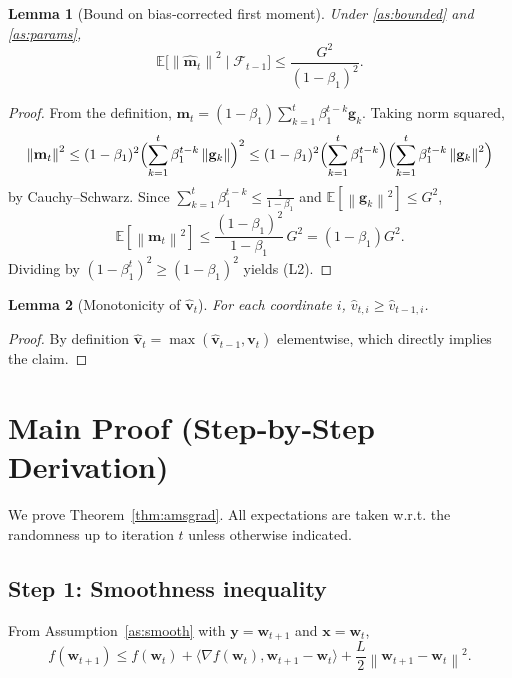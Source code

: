 \documentclass[11pt]{article}
\newtheorem{lemma}{Lemma}
\newcommand{\EE}{\mathbb{E}}
\newcommand{\norm}[1]{\left\lVert #1\right\rVert}
\begin{document}
\begin{lemma}[Bound on bias‑corrected first moment]\label{lem:mbound}
Under \ref{as:bounded} and \ref{as:params},
\[
\EE\bigl[\norm{\hat{\mathbf{m}}_{t}}^{2}\mid\mathcal{F}_{t-1}\bigr]
\le\frac{G^{2}}{(1-\beta_{1})^{2}}.
\tag{L2}
\]
\end{lemma}
\begin{proof}
From the definition,
$\mathbf{m}_{t}=(1-\beta_{1})\sum_{k=1}^{t}\beta_{1}^{t-k}\mathbf{g}_{k}$.
Taking norm squared,
\[
\norm{\mathbf{m}_{t}}^{2}
\le(1-\beta_{1})^{2}\Bigl(\sum_{k=1}^{t}\beta_{1}^{t-k}\norm{\mathbf{g}_{k}}\Bigr)^{2}
\le(1-\beta_{1})^{2}\Bigl(\sum_{k=1}^{t}\beta_{1}^{t-k}\Bigr)
\Bigl(\sum_{k=1}^{t}\beta_{1}^{t-k}\norm{\mathbf{g}_{k}}^{2}\Bigr)
\]
by Cauchy–Schwarz. Since $\sum_{k=1}^{t}\beta_{1}^{t-k}\le\frac{1}{1-\beta_{1}}$
and $\EE[\norm{\mathbf{g}_{k}}^{2}]\le G^{2}$,
\[
\EE[\norm{\mathbf{m}_{t}}^{2}]
\le\frac{(1-\beta_{1})^{2}}{1-\beta_{1}}\,G^{2}
= (1-\beta_{1})G^{2}.
\]
Dividing by $(1-\beta_{1}^{t})^{2}\ge(1-\beta_{1})^{2}$ yields (L2).
\end{proof}

\begin{lemma}[Monotonicity of $\hat{\mathbf{v}}_{t}$]\label{lem:monotone}
For each coordinate $i$, $\hat{v}_{t,i}\ge\hat{v}_{t-1,i}$.
\end{lemma}
\begin{proof}
By definition $\hat{\mathbf{v}}_{t}=\max(\hat{\mathbf{v}}_{t-1},\mathbf{v}_{t})$
elementwise, which directly implies the claim. \qedhere
\end{proof}

\section{Main Proof (Step‑by‑Step Derivation)}
\label{sec:proof}
We prove Theorem~\ref{thm:amsgrad}.  All expectations are taken w.r.t.
the randomness up to iteration $t$ unless otherwise indicated.

\subsection*{Step 1: Smoothness inequality}
From Assumption~\ref{as:smooth} with $\mathbf{y}=\mathbf{w}_{t+1}$ and
$\mathbf{x}=\mathbf{w}_{t}$,
\[
f(\mathbf{w}_{t+1})\le f(\mathbf{w}_{t})
   +\langle\nabla f(\mathbf{w}_{t}),\mathbf{w}_{t+1}-\mathbf{w}_{t}\rangle
   +\frac{L}{2}\norm{\mathbf{w}_{t+1}-\mathbf{w}_{t}}^{2}.
\tag{S1}
\]
\end{document}
